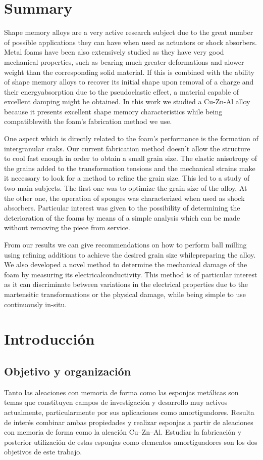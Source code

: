 \documentclass[a4paper,12pt,fleqn,twoside,openany]{book}
\begin{document}
\chapter*{Summary}

Shape memory alloys are a very active research subject due to the great number of possible applications they can have when used as actuators or shock absorbers. Metal foams have been also extensively studied as they have very good mechanical properties, such as bearing much greater deformations and alower weight than the corresponding solid material. If this is combined with the ability of shape memory alloys to recover its initial shape upon removal of a charge and their energyabsorption due to the pseudoelastic effect, a material capable of excellent damping might be obtained. In this work we studied a Cu-Zn-Al alloy because it presents excellent shape memory characteristics while being compatiblewith the foam's fabrication method we use.

One aspect which is directly related to the foam's performance is the formation of intergranular craks. Our current fabrication method doesn't allow the structure to cool fast enough in order to obtain a small grain size. The elastic anisotropy of the grains added to the transformation tensions and the mechanical strains make it necessary to look for a method to refine the grain size. This led to a study of two main subjects. The first one was to optimize the grain size of the alloy. At the other one, the operation of sponges was characterized when used as shock absorbers. Particular interest was given to the possibility of determining the deterioration of the foams by means of a simple analysis which can be made without removing the piece from service. 

From our results we can give recommendations on how to perform ball milling using refining additions to achieve the desired grain size whilepreparing the alloy. We also developed a novel method to determine the mechanical damage of the foam by measuring its electricalconductivity. This method is of particular interest as it can discriminate between variations in the electrical properties due to the martensitic transformations or the physical damage, while being simple to use continuously in-situ.

\chapter{Introducción}

\section*{Objetivo y organización}
Tanto las aleaciones con memoria de forma como las esponjas metálicas son temas que constituyen campos de investigación y desarrollo muy activos actualmente, particularmente por sus aplicaciones como amortiguadores. Resulta de interés combinar ambas propiedades y realizar esponjas a partir de aleaciones con memoria de forma como la aleación Cu–Zn–Al. Estudiar la fabricación y posterior utilización de estas esponjas como elementos amortiguadores son los dos objetivos de este trabajo.
\end{document}
